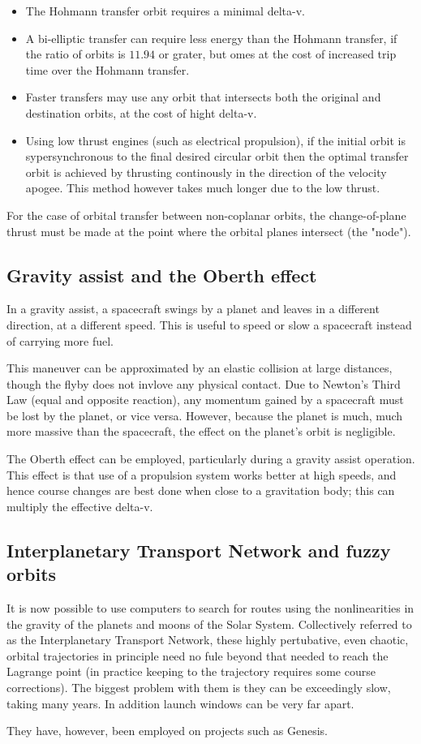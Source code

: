 \documentclass[12pt]{article}
\begin{document}
\begin{itemize}
  \item The Hohmann transfer orbit requires a minimal delta-v.
  \item A bi-elliptic transfer can require less energy than the Hohmann transfer, if the ratio of orbits is \(11.94\) or grater, but omes at the cost of increased trip time over the Hohmann transfer.
  \item Faster transfers may use any orbit that intersects both the original and destination orbits, at the cost of hight delta-v.
  \item Using low thrust engines (such as electrical propulsion), if the initial orbit is sypersynchronous to the final desired circular orbit then the optimal transfer orbit is achieved by thrusting continously in the direction of the velocity apogee. This method however takes much longer due to the low thrust.
\end{itemize}

For the case of orbital transfer between non-coplanar orbits, the change-of-plane thrust must be made at the point where the orbital planes intersect (the "node").

\subsection{Gravity assist and the Oberth effect}

In a gravity assist, a spacecraft swings by a planet and leaves in a different direction, at a different speed. This is useful to speed or slow a spacecraft instead of carrying more fuel.

This maneuver can be approximated by an elastic collision at large distances, though the flyby does not invlove any physical contact. Due to Newton's Third Law (equal and opposite reaction), any momentum gained by a spacecraft must be lost by the planet, or vice versa. However, because the planet is much, much more massive than the spacecraft, the effect on the planet's orbit is negligible.

The Oberth effect can be employed, particularly during a gravity assist operation. This effect is that use of a propulsion system works better at high speeds, and hence course changes are best done when close to a gravitation body; this can multiply the effective delta-v.

\subsection{Interplanetary Transport Network and fuzzy orbits}

It is now possible to use computers to search for routes using the nonlinearities in the gravity of the planets and moons of the Solar System. Collectively referred to as the Interplanetary Transport Network, these highly pertubative, even chaotic, orbital trajectories in principle need no fule beyond that needed to reach the Lagrange point (in practice keeping to the trajectory requires some course corrections). The biggest problem with them is they can be exceedingly slow, taking many years. In addition launch windows can be very far apart.

They have, however, been employed on projects such as Genesis.
\end{document}
